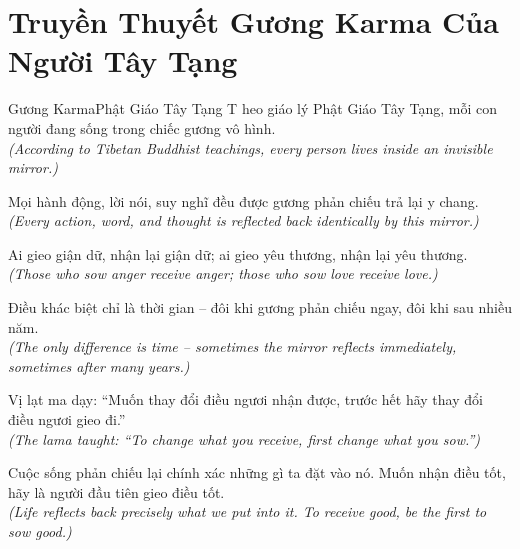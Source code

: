 \section{Truyền Thuyết Gương Karma Của Người Tây Tạng}
\begin{truyen}{Gương Karma}{Phật Giáo Tây Tạng}
T heo giáo lý Phật Giáo Tây Tạng, mỗi con người đang sống trong chiếc gương vô hình.\\
\textit{(According to Tibetan Buddhist teachings, every person lives inside an invisible mirror.)}

Mọi hành động, lời nói, suy nghĩ đều được gương phản chiếu trả lại y chang.\\
\textit{(Every action, word, and thought is reflected back identically by this mirror.)}

Ai gieo giận dữ, nhận lại giận dữ; ai gieo yêu thương, nhận lại yêu thương.\\
\textit{(Those who sow anger receive anger; those who sow love receive love.)}

Điều khác biệt chỉ là thời gian -- đôi khi gương phản chiếu ngay, đôi khi sau nhiều năm.\\
\textit{(The only difference is time -- sometimes the mirror reflects immediately, sometimes after many years.)}

Vị lạt ma dạy: ``Muốn thay đổi điều ngươi nhận được, trước hết hãy thay đổi điều ngươi gieo đi.''\\
\textit{(The lama taught: ``To change what you receive, first change what you sow.'')}

\end{truyen}
\begin{baihoc}
  Cuộc sống phản chiếu lại chính xác những gì ta đặt vào nó. Muốn nhận điều tốt, hãy là người đầu tiên gieo điều tốt.\\
  \textit{(Life reflects back precisely what we put into it. To receive good, be the first to sow good.)}
\end{baihoc}

